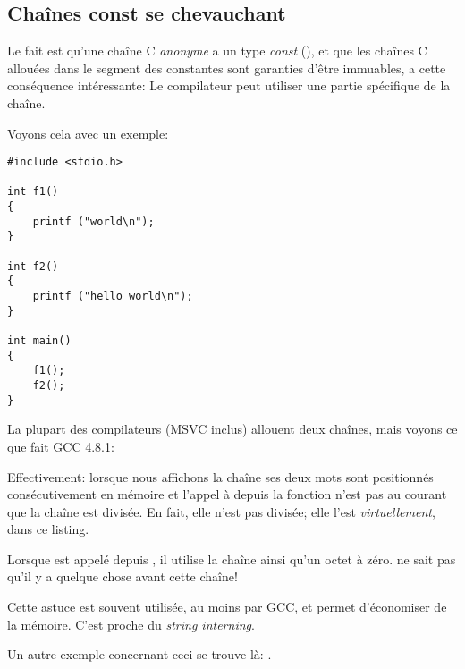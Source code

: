 ﻿\subsection{Chaînes const se chevauchant}
\label{use_parts_of_C_strings}

Le fait est qu'une chaîne C \emph{anonyme} a un type \emph{const} (),
et que les chaînes C allouées dans le segment des constantes sont garanties d'être immuables,
a cette conséquence intéressante:
Le compilateur peut utiliser une partie spécifique de la chaîne.

Voyons cela avec un exemple:

\begin{lstlisting}[style=customc]
#include <stdio.h>

int f1()
{
	printf ("world\n");
}

int f2()
{
	printf ("hello world\n");
}

int main()
{
	f1();
	f2();
}
\end{lstlisting}

La plupart des compilateurs \CCpp{} (MSVC inclus) allouent deux chaînes, mais voyons ce que fait GCC 4.8.1:



Effectivement: lorsque nous affichons la chaîne  ses deux mots sont positionnés
consécutivement en mémoire et l'appel à \puts depuis la fonction 
n'est pas au courant que la chaîne est divisée.
En fait, elle n'est pas divisée; elle l'est \emph{virtuellement}, dans ce listing.

Lorsque \puts est appelé depuis , il utilise la chaîne  ainsi qu'un
octet à zéro. \puts ne sait pas qu'il y a quelque chose avant cette chaîne!

Cette astuce est souvent utilisée, au moins par GCC, et permet d'économiser de la mémoire.
C'est proche du \emph{string interning}. %

Un autre exemple concernant ceci se trouve là: .

